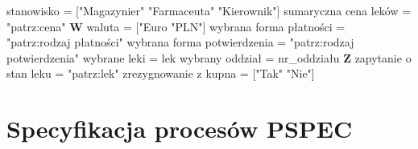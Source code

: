 \documentclass[a4paper, 11pt]{article}
\begin{document}
	\noindent
	stanowisko = ["Magazynier" \textpipe "Farmaceuta" \textpipe "Kierownik"] \newline
	sumaryczna cena leków = "patrz:cena" \newline \newline
	\textbf{W} \newline \newline
	\noindent
	waluta = ["Euro \textpipe "PLN"] \newline
	wybrana forma płatności = "patrz:rodzaj płatności" \newline
	wybrana forma potwierdzenia = "patrz:rodzaj potwierdzenia" \newline
	wybrane leki = {lek} \newline
	wybrany oddział = \at nr\_oddziału \newline \newline
	\textbf{Z} \newline \newline
	\noindent	
	zapytanie o stan leku = "patrz:lek" \newline
	zrezygnowanie z kupna = ["Tak" \textpipe "Nie"] \newline \newline
	
	\section{Specyfikacja procesów PSPEC}
\end{document}
